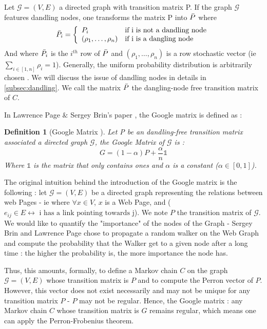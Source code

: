 \documentclass[sn-mathphys]{sn-jnl}%
\theoremstyle{thmstyleone}%
\theoremstyle{thmstyletwo}%
\theoremstyle{thmstylethree}%
\newtheorem{definition}[theo]{Definition}
\begin{document}
Let $\mathcal{G}=(V,E)$ a directed graph with transition matrix P.  If
the graph $\mathcal{G}$ features dandling nodes, one transforms the
matrix P into $\Bar{P}$ where
\begin{equation*}\label{eq:dangling_nodes_free}
    \Bar{P_{i}} = \left\{
    \begin{array}{ll}
        P_{i} & \mbox{if i is not a dandling node}  \\
        (\rho_1, \hdots, \rho_n) & \mbox{if i is a dangling node}
    \end{array}
    \right.
\end{equation*} 
And where $\Bar{P_{i}}$ is the $i^{th}$ row of $\Bar{P}$ and
$(\rho_1, \hdots, \rho_n)$ is a row stochastic vector (ie
$\underset{i \in [1, n]}{\sum} \rho_i = 1$). Generally, the uniform
probability distribution is arbitrarily chosen
\cite{langville_meyer_2004}. We will discuss the issue of dandling
nodes in details in \ref{subsec:dandling}. We call the matrix
$\Bar{P}$ the dangling-node free transition matrix of $C$.

In Lawrence Page $\&$ Sergey Brin's paper \cite{brin_page_1998}, the
Google matrix is defined as :

\begin{definition}[Google Matrix \cite{brin_page_1998}]
\label{def:google_matrix}
Let P be an dandling-free transition matrix associated a directed graph $\mathcal{G}$, the Google Matrix of $\mathcal{G}$ is :
\begin{equation*}
    G = (1-\alpha) P + \frac{\alpha}{n} \mathbb{1}
\end{equation*}
Where $\mathbb{1}$ is the matrix that only contains ones and $\alpha$ is a constant ($\alpha \in [0,1]$).

\end{definition}

The original intuition behind the introduction of the Google matrix is
the following : let $\mathcal{G}=(V,E)$ be a directed graph
representing the relations between web Pages - ie where
$\forall x \in V$, $x$ is a Web Page, and
($e_{ij} \in E \leftrightarrow \mbox{ i has a link pointing towards
  j}$). We note $P$ the transition matrix of $\mathcal{G}$. We would
like to quantify the "importance" of the nodes of the Graph - Sergey
Brin and Lawrence Page chose to propagate a random walker on the Web
Graph and compute the probability that the Walker get to a given node
after a long time : the higher the probability is, the more importance
the node has.

Thus, this amounts, formally, to define a Markov chain $C$ on the
graph $\mathcal{G}=(V, E)$ whose transition matrix is $P$ and to
compute the Perron vector of $P$. However, this vector does not exist
necessarily and may not be unique for any transition matrix $P$ - $P$
may not be regular. Hence, the Google matrix : any Markov chain $C$
whose transition matrix is $G$ remains regular, which means one can
apply the Perron-Frobenius theorem.
\end{document}
